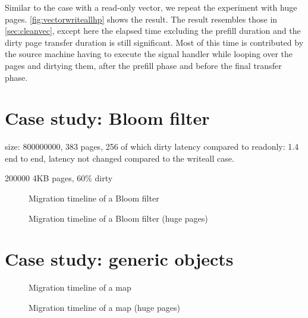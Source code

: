 Similar to the case with a read-only vector, we repeat the experiment with huge
pages. \autoref{fig:vectorwriteallhp} shows the result. The result resembles
those in \autoref{sec:cleanvec}, except here the elapsed time excluding the
prefill duration and the dirty page transfer duration is still significant. Most
of this time is contributed by the source machine having to execute the signal
handler while looping over the pages and dirtying them, after the
prefill phase and before the final transfer phase.

\section{Case study: Bloom filter}
\label{sec:evalmigfriendly}

size: 800000000, 383 pages, 256 of which dirty
latency compared to readonly: 1.4 end to end, latency not changed compared
to the writeall case.

200000 4KB pages, 60\% dirty

\begin{figure}[tp]
    \begin{center}
        
    \end{center}
    \caption{Migration timeline of a Bloom filter}
    \label{fig:bloomfilter}
\end{figure}

\begin{figure}[tp]
    \begin{center}
        
    \end{center}
    \caption{Migration timeline of a Bloom filter (huge pages)}
    \label{fig:bloomfilterhp}
\end{figure}

\section{Case study: generic objects}
\label{sec:evalgenericobj}

\begin{figure}[tp]
    \begin{center}
        
    \end{center}
    \caption{Migration timeline of a map}
    \label{fig:map}
\end{figure}

\begin{figure}[tp]
    \begin{center}
        
    \end{center}
    \caption{Migration timeline of a map (huge pages)}
    \label{fig:maphp}
\end{figure}



